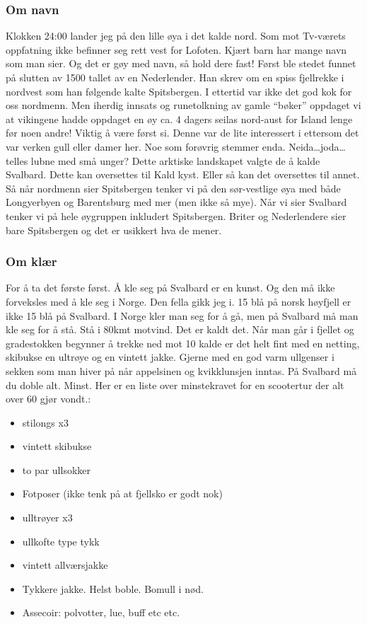 \subsubsection{Om navn}
Klokken 24:00 lander jeg på den lille øya i det kalde nord. Som mot
Tv-værets oppfatning ikke befinner seg rett vest for Lofoten.
Kjært barn har mange navn som man sier. Og det er gøy med navn,  så
hold dere fast! Først ble stedet funnet på slutten av 1500 tallet av
en Nederlender. Han skrev om en spiss fjellrekke i nordvest som han
følgende kalte Spitsbergen. I ettertid var ikke det god
kok for oss nordmenn. Men iherdig innsats og runetolkning av gamle
``bøker'' oppdaget vi at vikingene hadde oppdaget en øy ca. 4 dagers
seilas nord-aust for Island lenge før noen andre! Viktig å være først
si. Denne var de lite interessert i ettersom
det var verken gull eller damer her. Noe som forøvrig stemmer enda.
Neida\ldots joda\ldots telles lubne med små unger? 
Dette arktiske landskapet valgte de å kalde Svalbard. Dette kan
oversettes til Kald kyst. Eller så kan det oversettes til annet. Så
når
nordmenn sier Spitsbergen tenker vi på den sør-vestlige øya med både
Longyerbyen og Barentsburg med mer (men ikke så mye). Når vi sier
Svalbard tenker vi på hele øygruppen inkludert Spitsbergen. Briter og
Nederlendere sier bare Spitsbergen og det er usikkert hva de mener.

\subsubsection*{Om klær}

For å ta det første først. Å kle seg på Svalbard er en kunst. Og den må ikke forveksles med å kle seg
i Norge. Den fella gikk jeg i. 15 blå på norsk høyfjell er ikke 15 blå
på Svalbard. I Norge kler man  seg for å gå, men på
Svalbard må man kle seg for å stå. Stå i 80kmt motvind. Det er kaldt
det. Når man går i fjellet og gradestokken begynner å trekke
ned mot 10 kalde er det helt fint med en netting, skibukse en ultrøye
og en vintett jakke. Gjerne med en god varm ullgenser i sekken som man
hiver på når appelsinen og kvikklunsjen inntas. På Svalbard må du
doble alt. Minst. Her er en liste over minstekravet for en scootertur
der alt over 60 gjør vondt.:

\begin{itemize}
		\item stilongs x3
		\item vintett skibukse
		\item to par ullsokker
		\item Fotposer (ikke tenk på at fjellsko er godt nok)
		\item ulltrøyer x3
		\item ullkofte type tykk
		\item vintett allværsjakke
		\item Tykkere jakke. Helst boble. Bomull i nød.
		\item Assecoir: polvotter, lue, buff etc etc.
\end{itemize}

